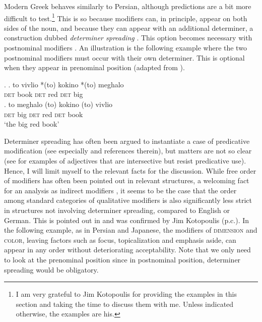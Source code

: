Modern Greek behaves similarly to Persian, although predictions are a bit more difficult to test.\footnote{I am very grateful to Jim Kotopoulis for providing the examples in this section and taking the time to discuss them with me. Unless indicated otherwise, the examples are his.} This is so because modifiers can, in principle, appear on both sides of the noun, and because they can appear with an additional determiner, a construction dubbed \textit{determiner spreading} \citep{androutsopoulou:1995:ds}. This option becomes necessary with postnominal modifiers \citep{alex:1998:adj, alex:2003:adj, campos:2004:ds, panagiotidis:2011:ds, lekakou:2012:poly, panayidou:2013:in}. An illustration is the following example where the two postnominal modifiers must occur with their own determiner. This is optional when they appear in prenominal position (adapted from \citealt[303]{alex:1998:adj}).   

\ex. \ag. to vivlio *(to) kokino *(to) meghalo\\
\textsc{det} book \textsc{det} red \textsc{det} big\\
\bg. to meghalo (to) kokino (to) vivlio\\
\textsc{det} big \textsc{det} red \textsc{det} book\\
`the big red book’

Determiner spreading has often been argued to instantiate a case of predicative modification (see especially \citealt[A3]{cinque:2010:adj} and references therein), but matters are not so clear (see \citealt{lekakou:2012:poly} for examples of adjectives that are intersective but resist predicative use). Hence, I will limit myself to the relevant facts for the discussion. While free order of modifiers has often been pointed out in relevant structures, a welcoming fact for an analysis as indirect modifiers \citep{alex:1998:adj, alex:2007:nounphrase, cinque:2010:adj}, it seems to be the case that the order among standard categories of qualitative modifiers is also significantly less strict in structures not involving determiner spreading, compared to  English or  German. This is pointed out in \citet[174]{laenzlinger:2011:elements} and was confirmed by Jim Kotopoulis (p.c.). In the following example, as in  Persian and Japanese, the modifiers of \textsc{dimension} and \textsc{color}, leaving factors such as focus, topicalization and emphasis aside, can appear in any order without deteriorating acceptability. Note that we only need to look at the prenominal position since in postnominal position, determiner spreading would be obligatory.   

